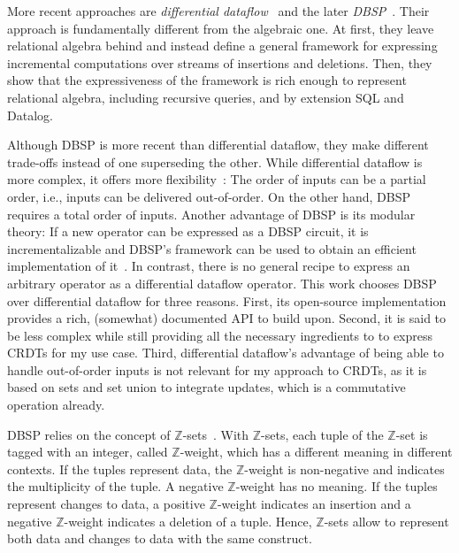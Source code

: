More recent approaches are \emph{differential dataflow}~\cite{mcsherry2013differential}
and the later \emph{DBSP}~\cite{budiu2024dbsp, budiu2025dbsp}.
Their approach is fundamentally different from the algebraic one.
At first, they leave relational algebra behind and instead define a general
framework for expressing incremental computations over streams of insertions
and deletions.
Then, they show that the expressiveness of the framework is rich enough to
represent relational algebra, including recursive queries, and by extension
SQL and Datalog.

Although DBSP is more recent than differential dataflow,
they make different trade-offs instead of one superseding the other.
While differential dataflow is more complex, it offers more
flexibility~\cite{budiu2025dbsp}:
The order of inputs can be a partial order, i.e., inputs can be delivered
out-of-order.
On the other hand, DBSP requires a total order of inputs.
Another advantage of DBSP is its modular theory:
If a new operator can be expressed as a DBSP circuit, it is incrementalizable
and DBSP's framework can be used to obtain an efficient implementation
of it~\cite{budiu2025dbsp}.
In contrast, there is no general recipe to express an arbitrary operator
as a differential dataflow operator.
This work chooses DBSP over differential dataflow for three reasons.
First, its open-source implementation~\cite{feldera} provides a rich,
(somewhat) documented \acs{API}\footnotemark{} to build upon.
Second, it is said to be less complex while still providing all the necessary
ingredients to to express \acp{CRDT} for my use case.
Third, differential dataflow's advantage of being able to handle out-of-order
inputs is not relevant for my approach to \acp{CRDT}, as it is based on sets and
set union to integrate updates, which is a commutative operation already.


\newcommand{\zset}{\(\mathbb{Z}\)-set}
\newcommand{\zsets}{\(\mathbb{Z}\)-sets}
\newcommand{\zweight}{\(\mathbb{Z}\)-weight}

DBSP relies on the concept of \zsets{}~\cite{green2007provenance}\footnotemark{}.
With \zsets{}, each tuple of the \zset{} is tagged with an integer,
called \zweight{}, which has a different meaning in different contexts.
If the tuples represent data, the \zweight{} is non-negative and indicates
the multiplicity of the tuple.
A negative \zweight{} has no meaning.
If the tuples represent changes to data, a positive \zweight{} indicates
an insertion and a negative \zweight{} indicates a deletion of a tuple.
Hence, \zsets{} allow to represent both data and changes to data with the
same construct.

